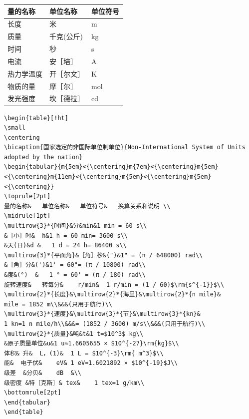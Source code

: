 \begin{table}[!ht]
	\small
	\centering
	\begin{tabular}{m{6em}<{\centering}m{6em}<{\centering}m{6em}<{\centering}}
		\toprule[2pt]
		量的名称&单位名称&单位符号 \\
		\midrule[1pt]
		长度	&米&	m\\
		质量&	千克(公斤)&	kg\\
		时间&	秒&	s\\
		电流&	安［培］&	A\\
		热力学温度&	开［尔文］&	K\\
		物质的量&	摩［尔］&	mol\\
		发光强度&	坎［德拉］&	cd\\
		\bottomrule[2pt]
	\end{tabular}
\end{table}
\begin{lstlisting}[caption={表3.5绘制代码}]
\begin{table}[!ht]
\small
\centering
\bicaption{国家选定的非国际单位制单位}{Non-International System of Units adopted by the nation} 
\begin{tabular}{m{5em}<{\centering}m{7em}<{\centering}m{5em}<{\centering}m{11em}<{\centering}m{5em}<{\centering}m{5em}<{\centering}}
\toprule[2pt]
量的名称&	单位名称&	单位符号&	换算关系和说明 \\
\midrule[1pt]
\multirow{3}*{时间}&分&min&1 min = 60 s\\
&［小］时&	h&1 h = 60 min= 3600 s\\
&天(日)&d	&	1 d = 24 h= 86400 s\\
\multirow{3}*{平面角}&［角］秒&(")&1" = (π / 648000) rad\\
&［角］分&(')&1' = 60"= (π / 10800) rad\\
&度&(°)	&	1 ° = 60' = (π / 180) rad\\
旋转速度&	转每分&	r/min&	1 r/min = (1 / 60)$\rm{s^{-1}}$\\
\multirow{2}*{长度}&\multirow{2}*{海里}&\multirow{2}*{n mile}&
mile = 1852 m\\&&&(只用于航行)\\
\multirow{3}*{速度}&\multirow{3}*{节}&\multirow{3}*{kn}&
1 kn=1 n mile/h\\&&&= (1852 / 3600) m/s\\&&&(只用于航行)\\
\multirow{2}*{质量}&吨&t&1 t=$10^3$ kg\\
&原子质量单位&u&1 u≈1.6605655 × $10^{-27}\rm{kg}$\\
体积&	升&	L，(1)&	1 L = $10^{-3}\rm{ m^3}$\\
能&	电子伏&	eV&	1 eV≈1.6021892 × $10^{-19}$J\\
级差	&分贝&	dB	&\\
级密度	&特［克斯］&	tex&	1 tex=1 g/km\\	
\bottomrule[2pt]
\end{tabular}
\end{table}
\end{lstlisting}
